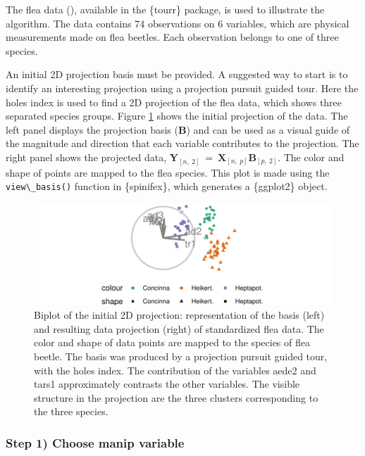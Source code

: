 \documentclass{monashthesis}
\begin{document}
The flea data (\textcite{lubischew_use_1962}), available in the \{tourr\} package, is used to illustrate the algorithm. The data contains 74 observations on 6 variables, which are physical measurements made on flea beetles. Each observation belongs to one of three species.

An initial 2D projection basis must be provided. A suggested way to start is to identify an interesting projection using a projection pursuit guided tour. Here the holes index is used to find a 2D projection of the flea data, which shows three separated species groups. Figure \ref{fig:ch3fig1} shows the initial projection of the data. The left panel displays the projection basis (\(\textbf{B}\)) and can be used as a visual guide of the magnitude and direction that each variable contributes to the projection. The right panel shows the projected data, \(\textbf{Y}_{[n,~2]} ~=~ \textbf{X}_{[n,~p]} \textbf{B}_{[p,~2]}\). The color and shape of points are mapped to the flea species. This plot is made using the \texttt{view\textbackslash{}\_basis()} function in \{spinifex\}, which generates a \{ggplot2\} \autocite{wickham_ggplot2_2016} object.

\begin{figure}

{\centering \includegraphics[width=1\linewidth,]{./figures_from_script/ch3_fig1_biplot} 

}

\caption{Biplot of the initial 2D projection: representation of the basis (left) and resulting data projection (right) of standardized flea data. The color and shape of data points are mapped to the species of flea beetle. The basis was produced by a projection pursuit guided tour, with the holes index. The contribution of the variables aede2 and tars1 approximately contrasts the other variables. The visible structure in the projection are the three clusters corresponding to the three species.}\label{fig:ch3fig1}
\end{figure}

\hypertarget{step-1-choose-manip-variable}{%
\subsubsection{Step 1) Choose manip variable}\label{step-1-choose-manip-variable}}
\end{document}

